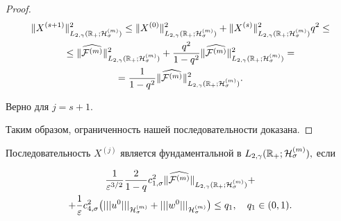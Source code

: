 \begin{proof}
\begin{multline*}

\|X^{(s+1)}\|^2_{L_{2,\gamma}(\mathbb R_{+};{\cal H}^{(m)}_{\sigma})} \le 

\|X^{(0)}\|^2_{L_{2,\gamma}(\mathbb R_{+};{\cal H}^{(m)}_{\sigma})}+

\|X^{(s)}\|^2_{L_{2,\gamma}(\mathbb R_{+};{\cal H}^{(m)}_{\sigma})}q^2\le 

\\

\le

\|\widehat{{\cal F}^{(m)}} \|^2_{L_{2,\gamma}(\mathbb R_{+};{\cal H}^{(m)}_{\sigma})}+

\frac{q^2}{1-q^2}\| \widehat{{\cal F}^{(m)}} \|^2_{L_{2,\gamma}(\mathbb R_{+};{\cal H}^{(m)}_{\sigma})}

=

\\

=\frac{1}{1-q^2}\| \widehat{{\cal F}^{(m)}} \|^2_{L_{2,\gamma}(\mathbb R_{+};{\cal H}^{(m)}_{\sigma})}.

\end{multline*}

Верно для $j=s+1$.

Таким образом, ограниченность нашей последовательности доказана.

\end{proof} 



\smallskip



 \hypertarget{dukh:th:5}{}

\begin{theorem}[5]Последовательность $X^{(j)}$ является фундаментальной в \linebreak ${L_{2,\gamma}(\mathbb R_{+};{\cal H}^{(m)}_{\sigma})},$ если

\begin{multline}

\frac{1}{\varepsilon^{3/2}}\frac{2}{1-q}c^2_{1,\sigma}

\|\widehat{{\cal F}^{(m)}} \|_{L_{2,\gamma}(\mathbb R_{+};{\cal H}^{(m)}_{\sigma})}+

\\

+\frac{1}{\varepsilon}c^2_{4,\sigma} 

\bigl(|||u^0|||_{{\cal H}^{(m)}_\sigma}+|||w^0|||_{{\cal H}^{(m)}_\sigma}\bigr)\le q_1, \quad  q_1\in(0, 1).

\end{multline}

\end{theorem}



